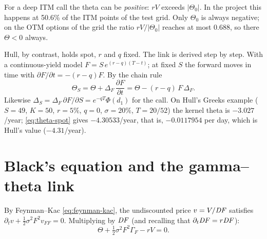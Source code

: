 \begin{attenzione}[title={The project's theta is not Hull's}]
For a deep ITM call the theta can be \emph{positive}: $rV$ exceeds $|\Theta_0|$. In the project this happens at
50.6\% of the ITM points of the test grid. Only $\Theta_0$ is always negative; on the OTM options of the grid the
ratio $rV/|\Theta_0|$ reaches at most 0.688, so there $\Theta<0$ always.

Hull, by contrast, holds spot, $r$ and $q$ fixed. The link is derived step by step. With a continuous-yield model
$F=S\,e^{(r-q)(T-t)}$; at fixed $S$ the forward moves in time with $\partial F/\partial t=-(r-q)F$. By the chain
rule
\begin{equation}\label{eq:theta-spot}
\Theta_S=\Theta+\Delta_F\,\frac{\partial F}{\partial t}=\Theta-(r-q)\,F\,\Delta_F .
\end{equation}
Likewise $\Delta_S=\Delta_F\,\partial F/\partial S=e^{-qT}\Phi(d_1)$ for the call. On Hull's Greeks example
($S=49$, $K=50$, $r=5\%$, $q=0$, $\sigma=20\%$, $T=20/52$) the kernel theta is $-3.027$/year;
\eqref{eq:theta-spot} gives $-4.30533$/year, that is, $-0.0117954$ per day, which is Hull's value ($-4.31$/year).
\end{attenzione}

\section{Black's equation and the gamma--theta link}
By Feynman--Kac \eqref{eq:feynman-kac}, the undiscounted price $v=V/\mathit{DF}$ satisfies
$\partial_tv+\frac12\sigma^2F^2v_{FF}=0$. Multiplying by $\mathit{DF}$ (and recalling that $\partial_t\mathit{DF}=r\mathit{DF}$):
\begin{equation}\label{eq:pde-black}
\Theta+\tfrac12\sigma^2F^2\Gamma_F-rV=0 .
\end{equation}
